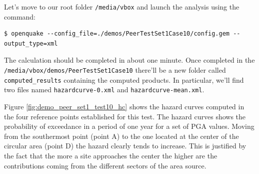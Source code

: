 Let's move to our root folder \texttt{/media/vbox} and launch
the analysis using the command:
\begin{Verbatim}[frame=single, commandchars=\\\{\}, fontsize=\small]
$ openquake --config_file=./demos/PeerTestSet1Case10/config.gem --output_type=xml
\end{Verbatim}
The calculation should be completed in about one minute. Once completed
in the \texttt{/media/\-vbox/\-demos/\-PeerTestSet1Case10} there'll be a new
folder called \texttt{computed\_results} containing the computed products.
In particular, we'll find two files named \texttt{hazardcurve-0.xml} and
\texttt{hazardcurve-mean.xml}.

Figure \ref{fig:demo_peer_set1_test10_hc} shows the hazard curves computed 
in the four reference points established for this test. 
The hazard curves shows the probability of exceedance in a 
period of one year for a set of PGA values. 
Moving from the southermost point (point A) to the one located at the 
center of the circular area (point D) the hazard clearly tends to increase.
This is justified by the fact that the more a site approaches the center
the higher are the contributions coming from the different sectors of the 
area source.

